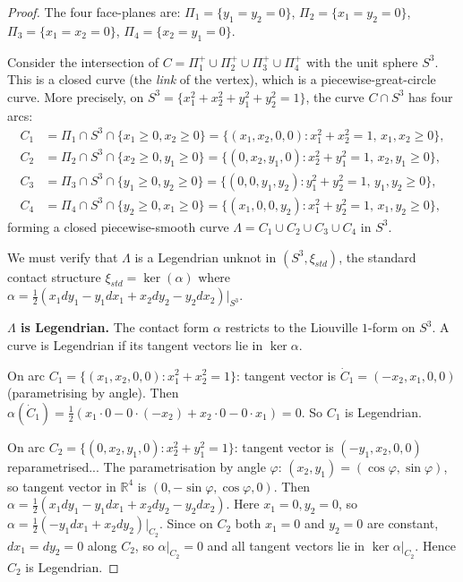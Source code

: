 \documentclass[12pt]{article}
\theoremstyle{definition}
\begin{document}
\begin{proof}
The four face-planes are: $\Pi_1 = \{y_1=y_2=0\}$, $\Pi_2 = \{x_1=y_2=0\}$, $\Pi_3 = \{x_1=x_2=0\}$, $\Pi_4 = \{x_2=y_1=0\}$.

Consider the intersection of $C = \Pi_1^+ \cup \Pi_2^+ \cup \Pi_3^+ \cup \Pi_4^+$ with the unit sphere $S^3$. This is a closed curve (the \emph{link} of the vertex), which is a piecewise-great-circle curve. More precisely, on $S^3 = \{x_1^2+x_2^2+y_1^2+y_2^2=1\}$, the curve $C \cap S^3$ has four arcs:
\begin{align*}
  C_1 &= \Pi_1 \cap S^3 \cap \{x_1\geq 0, x_2\geq 0\} = \{(x_1,x_2,0,0): x_1^2+x_2^2=1,\, x_1,x_2\geq 0\},\\
  C_2 &= \Pi_2 \cap S^3 \cap \{x_2\geq 0, y_1\geq 0\} = \{(0,x_2,y_1,0): x_2^2+y_1^2=1,\, x_2,y_1\geq 0\},\\
  C_3 &= \Pi_3 \cap S^3 \cap \{y_1\geq 0, y_2\geq 0\} = \{(0,0,y_1,y_2): y_1^2+y_2^2=1,\, y_1,y_2\geq 0\},\\
  C_4 &= \Pi_4 \cap S^3 \cap \{y_2\geq 0, x_1\geq 0\} = \{(x_1,0,0,y_2): x_1^2+y_2^2=1,\, x_1,y_2\geq 0\},
\end{align*}
forming a closed piecewise-smooth curve $\Lambda = C_1 \cup C_2 \cup C_3 \cup C_4$ in $S^3$.

We must verify that $\Lambda$ is a Legendrian unknot in $(S^3, \xi_{std})$, the standard contact structure $\xi_{std} = \ker(\alpha)$ where $\alpha = \frac{1}{2}(x_1 dy_1 - y_1 dx_1 + x_2 dy_2 - y_2 dx_2)|_{S^3}$.

\medskip
\noindent\textbf{$\Lambda$ is Legendrian.} The contact form $\alpha$ restricts to the Liouville $1$-form on $S^3$. A curve is Legendrian if its tangent vectors lie in $\ker\alpha$.

On arc $C_1 = \{(x_1,x_2,0,0): x_1^2+x_2^2=1\}$: tangent vector is $\dot C_1 = (-x_2, x_1, 0, 0)$ (parametrising by angle). Then $\alpha(\dot C_1) = \frac{1}{2}(x_1 \cdot 0 - 0 \cdot (-x_2) + x_2 \cdot 0 - 0 \cdot x_1) = 0$. So $C_1$ is Legendrian.

On arc $C_2 = \{(0,x_2,y_1,0): x_2^2+y_1^2=1\}$: tangent vector is $(-y_1, x_2, 0, 0)$ reparametrised... The parametrisation by angle $\varphi$: $(x_2,y_1) = (\cos\varphi, \sin\varphi)$, so tangent vector in $\mathbb{R}^4$ is $(0,-\sin\varphi, \cos\varphi, 0)$. Then $\alpha = \frac{1}{2}(x_1 dy_1 - y_1 dx_1 + x_2 dy_2 - y_2 dx_2)$. Here $x_1=0, y_2=0$, so $\alpha = \frac{1}{2}(-y_1 dx_1 + x_2 dy_2)|_{C_2}$. Since on $C_2$ both $x_1=0$ and $y_2=0$ are constant, $dx_1=dy_2=0$ along $C_2$, so $\alpha|_{C_2}=0$ and all tangent vectors lie in $\ker\alpha|_{C_2}$. Hence $C_2$ is Legendrian.


\end{proof}
\end{document}
